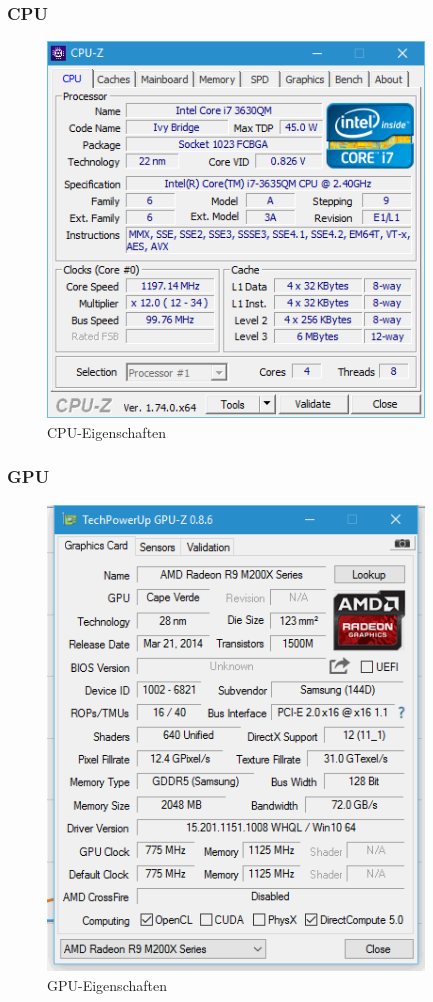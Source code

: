 \subsubsection{CPU}
\begin{figure}[!h]
	\begin{center}
		\includegraphics[width=10cm]{images/cpu_specs.png}
		\caption{CPU-Eigenschaften}
	\end{center}
\end{figure}
\newpage
\subsubsection{GPU}
\begin{figure}[!h]
	\begin{center}
		\includegraphics[width=10cm]{images/gpu_specs.png}
		\caption{GPU-Eigenschaften}
	\end{center}
\end{figure}
\newpage
